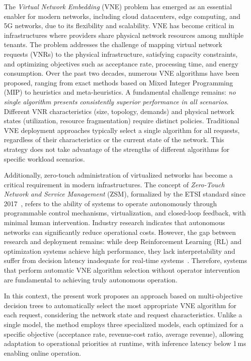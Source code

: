 \documentclass[a4paper,twoside]{article}
\begin{document}
The \textit{Virtual Network Embedding} (VNE) problem has emerged as an essential enabler for modern networks, including cloud datacenters, edge computing, and 5G networks, due to its flexibility and scalability. VNE has become critical in infrastructures where providers share physical network resources among multiple tenants. The problem addresses the challenge of mapping virtual network requests (VNRs) to the physical infrastructure, satisfying capacity constraints, and optimizing objectives such as acceptance rate, processing time, and energy consumption.
%
Over the past two decades, numerous VNE algorithms have been proposed, ranging from exact methods based on Mixed Integer Programming (MIP) to heuristics and meta-heuristics.
A fundamental challenge remains: \textit{no single algorithm presents consistently superior performance in all scenarios}.
Different VNR characteristics (size, topology, demands) and physical network states (utilization, resource fragmentation) require distinct policies.
%
Traditional VNE deployment approaches typically select a single algorithm for all requests, regardless of their characteristics or the current state of the network. This strategy does not take advantage of the strengths of different algorithms for specific workload scenarios.

Additionally, zero-touch administration of virtualized networks has become a critical requirement in modern infrastructures.
The concept of \textit{Zero-Touch Network and Service Management} (ZSM), formalized by the ETSI standard since 2017~\cite{etsi-zsm}, refers to the ability of systems to operate autonomously through programmable control mechanisms, virtualization, and closed-loop feedback, with minimal human intervention.
Industry research indicates that autonomous networks can significantly reduce operational costs.
However, the gap between research and deployment remains: while deep Reinforcement Learning (RL) and optimization systems achieve high performance, they lack interpretability and suffer from decision latency inadequate for real-time systems~\cite{white2024zerotough}.
Therefore, systems that perform automatic VNE algorithm selection without operator intervention are fundamental to achieving truly autonomous operation.

In this context, the present work proposes an approach based on multi-objective decision trees to automatically select the most appropriate VNE algorithm for each request, considering the network state and request characteristics.
Unlike a single model, the method employs three specialized models, each optimized for a specific objective (acceptance rate, revenue-cost ratio, average revenue), allowing adaptation to operational priorities at runtime, with inference latency below 1\,ms enabling online operation.
\end{document}
